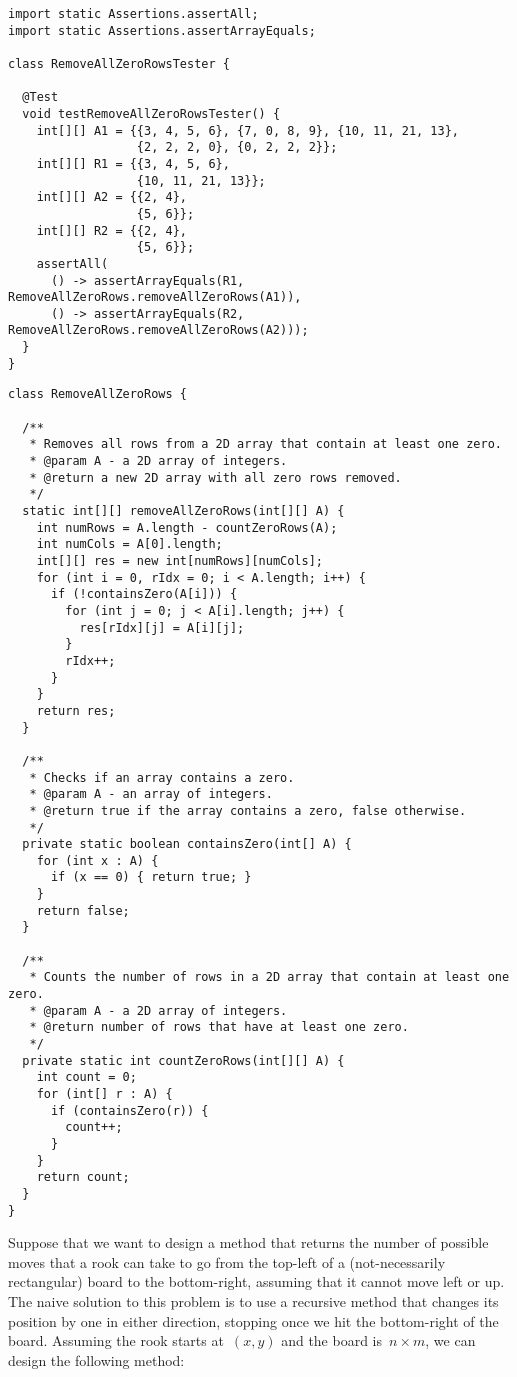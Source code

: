 \begin{lstlisting}[language=MyJava]
import static Assertions.assertAll;
import static Assertions.assertArrayEquals;

class RemoveAllZeroRowsTester {

  @Test
  void testRemoveAllZeroRowsTester() {
    int[][] A1 = {{3, 4, 5, 6}, {7, 0, 8, 9}, {10, 11, 21, 13}, 
                  {2, 2, 2, 0}, {0, 2, 2, 2}};
    int[][] R1 = {{3, 4, 5, 6}, 
                  {10, 11, 21, 13}};
    int[][] A2 = {{2, 4}, 
                  {5, 6}};
    int[][] R2 = {{2, 4}, 
                  {5, 6}};
    assertAll(
      () -> assertArrayEquals(R1, RemoveAllZeroRows.removeAllZeroRows(A1)),
      () -> assertArrayEquals(R2, RemoveAllZeroRows.removeAllZeroRows(A2)));
  }
}
\end{lstlisting}

\begin{lstlisting}[language=MyJava]
class RemoveAllZeroRows {

  /**
   * Removes all rows from a 2D array that contain at least one zero.
   * @param A - a 2D array of integers.
   * @return a new 2D array with all zero rows removed.
   */
  static int[][] removeAllZeroRows(int[][] A) {
    int numRows = A.length - countZeroRows(A);
    int numCols = A[0].length;
    int[][] res = new int[numRows][numCols];
    for (int i = 0, rIdx = 0; i < A.length; i++) {
      if (!containsZero(A[i])) {
        for (int j = 0; j < A[i].length; j++) {
          res[rIdx][j] = A[i][j];
        }
        rIdx++;
      }
    }
    return res;
  }

  /**
   * Checks if an array contains a zero.
   * @param A - an array of integers.
   * @return true if the array contains a zero, false otherwise.
   */
  private static boolean containsZero(int[] A) {
    for (int x : A) {
      if (x == 0) { return true; }
    }
    return false;
  }

  /**
   * Counts the number of rows in a 2D array that contain at least one zero.
   * @param A - a 2D array of integers.
   * @return number of rows that have at least one zero.
   */
  private static int countZeroRows(int[][] A) {
    int count = 0;
    for (int[] r : A) {
      if (containsZero(r)) {
        count++;
      }
    }
    return count;
  }
}
\end{lstlisting}

Suppose that we want to design a method that returns the number of possible moves that a rook can take to go from the top-left of a (not-necessarily rectangular) board to the bottom-right, assuming that it cannot move left or up. 
The naive solution to this problem is to use a recursive method that changes its position by one in either direction, stopping once we hit the bottom-right of the board. 
Assuming the rook starts at~$(x, y)$ and the board is~$n \times m$, we can design the following method:

